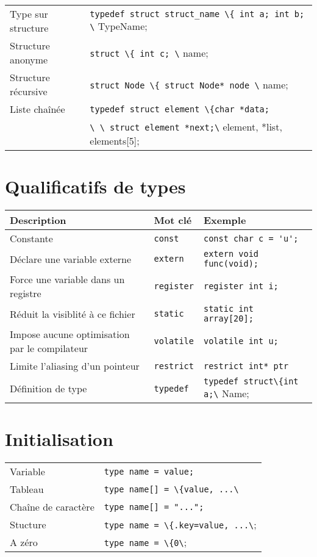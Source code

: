 \documentclass{article}
\newcommand{\cd}{\lstinline}
\begin{document}
\begin{multicols*}{3}
\begin{tabularx}{\linewidth}{Xl}
  Type sur structure  & \cd{typedef struct struct_name \{ int a; int b; \} TypeName;} \\
  Structure anonyme   & \cd{struct \{ int c; \} name;} \\
  Structure récursive & \cd{struct Node \{ struct Node* node \} name;} \\
  Liste chaînée       & \cd{typedef struct element \{char *data;} \\
                      & \cd{\ \ struct element *next;\} element, *list, elements[5];}
\end{tabularx}

\section*{Qualificatifs de types}

\begin{tabularx}{\linewidth}{X|l|l}
  \bf Description                     & \bf Mot clé & \bf Exemple \\
  \hline
  Constante                           & \cd{const}    & \cd{const char c = 'u';}\\
  Déclare une variable externe        & \cd{extern}   & \cd{extern void func(void);}\\
  Force une variable dans un registre & \cd{register} & \cd{register int i;}\\
  Réduit la visiblité à ce fichier    & \cd{static}   & \cd{static int array[20];}\\
  Impose aucune optimisation par le compilateur & \cd{volatile} & \cd{volatile int u;}\\
  Limite l'aliasing d'un pointeur     & \cd{restrict} & \cd{restrict int* ptr}\\
  Définition de type                  & \cd{typedef} & \cd{typedef struct\{int a;\} Name;}\\
\end{tabularx}

\section*{Initialisation}
\begin{tabularx}{\linewidth}{Xl}
  Variable & \cd{type name = value;} \\
  Tableau & \cd{type name[] = \{value, ...\}}; \\
  Chaîne de caractère & \cd{type name[] = "...";} \\
  Stucture & \cd{type name = \{.key=value, ...\};} \\
  A zéro & \cd{type name = \{0\};} \\
\end{tabularx}


\end{multicols*}
\end{document}
